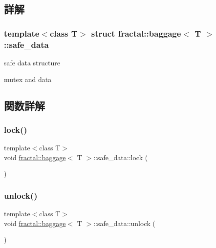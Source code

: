 \subsection{詳解}
\subsubsection*{template$<$class T$>$\newline
struct fractal\+::baggage$<$ T $>$\+::safe\+\_\+data}

safe data structure 

mutex and data 

\subsection{関数詳解}
\mbox{\label{structfractal_1_1baggage_1_1safe__data_aa441d027dbf60530c88a586a758e862e}} 
\subsubsection{\texorpdfstring{lock()}{lock()}}
{\footnotesize\ttfamily template$<$class T$>$ \\
void \hyperlink{classfractal_1_1baggage}{fractal\+::baggage}$<$ T $>$\+::safe\+\_\+data\+::lock (\begin{DoxyParamCaption}{ }\end{DoxyParamCaption})\hspace{0.3cm}{\ttfamily [inline]}}

\mbox{\label{structfractal_1_1baggage_1_1safe__data_a7e1acde240d0f75ad744edfc114cdf55}} 
\subsubsection{\texorpdfstring{unlock()}{unlock()}}
{\footnotesize\ttfamily template$<$class T$>$ \\
void \hyperlink{classfractal_1_1baggage}{fractal\+::baggage}$<$ T $>$\+::safe\+\_\+data\+::unlock (\begin{DoxyParamCaption}{ }\end{DoxyParamCaption})\hspace{0.3cm}{\ttfamily [inline]}}



